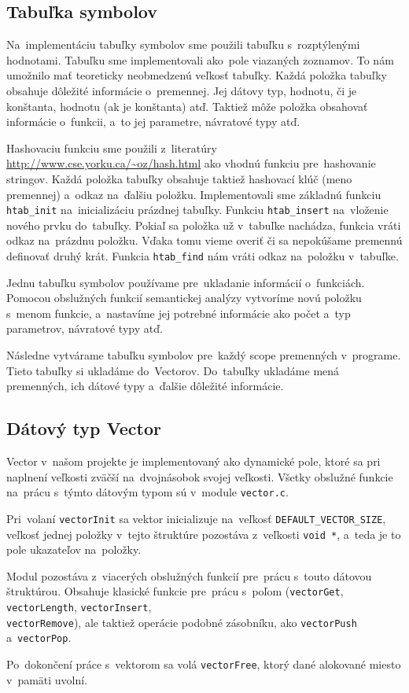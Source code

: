 \documentclass[a4paper, 12pt]{article}[25.11.2020]
\begin{document}
    \subsection{Tabuľka symbolov}\label{symTable}
        \par Na~implementáciu tabuľky symbolov sme použili tabuľku s~rozptýlenými hodnotami.
        Tabuľku sme implementovali ako~pole viazaných zoznamov. To nám umožnilo mať teoreticky
        neobmedzenú veľkosť tabuľky. Každá položka tabuľky obsahuje dôležité informácie
        o~premennej. Jej dátovy typ, hodnotu, či je konštanta, hodnotu (ak je konštanta) atď.
        Taktiež môže položka obsahovať informácie o~funkcii, a~to jej parametre, návratové typy
        atď.
        \par Hashovaciu funkciu sme použili z~literatúry
        \url{http://www.cse.yorku.ca/~oz/hash.html} ako
        vhodnú funkciu pre~hashovanie stringov. Každá položka tabuľky obsahuje taktiež
        hashovací klúč (meno premennej) a~odkaz na~ďalšiu položku. Implementovali sme základnú
        funkciu \verb|htab_init| na~inicializáciu prázdnej tabuľky. Funkciu \verb|htab_insert|
        na~vloženie nového prvku do~tabuľky. Pokiaľ sa položka už v~tabuľke nachádza, funkcia
        vráti odkaz na~prázdnu položku. Vďaka tomu vieme overiť či sa nepokúšame premennú
        definovať druhý krát. Funkcia \verb|htab_find| nám vráti odkaz na~položku v~tabuľke. 
        \par Jednu tabuľku symbolov používame pre~ukladanie informácií o~funkciách. Pomocou
        obslužných funkcií semantickej analýzy vytvoríme novú položku s~menom funkcie,
        a~nastavíme jej potrebné informácie ako počet a~typ parametrov, návratové typy atď.
        \par Následne vytvárame tabuľku symbolov pre~každý scope premenných v~programe. Tieto
        tabuľky si ukladáme do~Vectorov. Do~tabuľky ukladáme mená premenných, ich dátové typy
        a~ďalšie dôležité informácie.
    \subsection{Dátový typ Vector}
        \par Vector v~našom projekte je implementovaný ako dynamické pole, ktoré sa pri
        naplnení veľkosti zväčší na~dvojnásobok svojej veľkosti. Všetky obslužné funkcie
        na~prácu s~týmto dátovým typom sú v~module \verb|vector.c|.
        \par Pri~volaní \verb|vectorInit| sa vektor inicializuje na~veľkosť
        \verb|DEFAULT_VECTOR_SIZE|, veľkosť jednej položky v~tejto štruktúre pozostáva
        z~veľkosti \verb|void *|, a~teda je to pole ukazateľov na~položky.
        \par Modul pozostáva z~viacerých obslužných funkcií pre~prácu s~touto dátovou
        štruktúrou. Obsahuje klasické funkcie pre~prácu s~poľom (\verb|vectorGet|,
        \verb|vectorLength|, \verb|vectorInsert|, \\ \verb|vectorRemove|), ale taktiež operácie
        podobné zásobníku, ako \verb|vectorPush| a~\verb|vectorPop|.
        \par Po~dokončení práce s~vektorom sa volá \verb|vectorFree|, ktorý dané alokované
        miesto v~pamäti uvolní.
\end{document}
